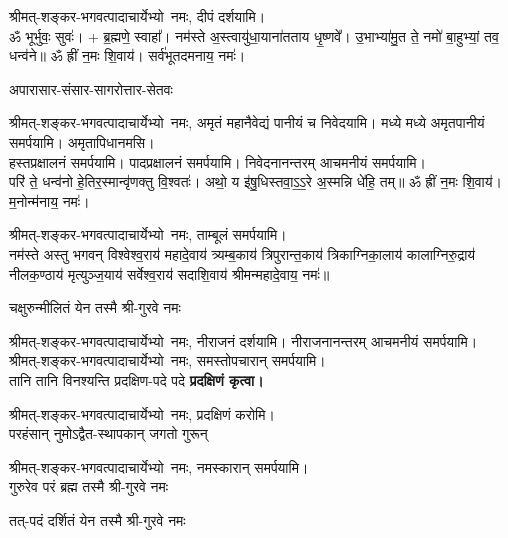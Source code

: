 \begin{center}
श्रीमत्-शङ्कर-भगवत्पादाचार्येभ्यो~नमः, दीपं दर्शयामि।\\


ॐ भूर्भुवः॒ सुवः॑। + ब्र॒ह्मणे॒ स्वाहा᳚। नम॑स्ते अ॒स्त्वायु॑धा॒याना॑तताय धृ॒ष्णवे᳚। उ॒भाभ्या॑मु॒त ते॒ नमो॑ बा॒हुभ्यां॒ तव॒ धन्व॑ने॥ ॐ ह्रीं न॒मः शि॒वाय॑। सर्व॑भूतदमनाय॒ नमः॑। 

{अपारासार-संसार-सागरोत्तार-सेतवः}

श्रीमत्-शङ्कर-भगवत्पादाचार्येभ्यो~नमः, अमृतं महानैवेद्यं पानीयं च निवेदयामि। मध्ये मध्ये अमृतपानीयं समर्पयामि। अमृतापिधानमसि।\\
हस्तप्रक्षालनं समर्पयामि। पादप्रक्षालनं समर्पयामि। निवेदनानन्तरम् आचमनीयं समर्पयामि।\\


परि॑ ते॒ धन्व॑नो हे॒तिर॒स्मान्वृ॑णक्तु वि॒श्वतः॑। अथो॒ य इ॑षु॒धिस्तवा॒ऽ॒ऽ॒रे अ॒स्मन्नि धे॑हि॒ तम्॥ ॐ ह्रीं न॒मः शि॒वाय॑। म॒नोन्म॑नाय॒ नमः॑। 


श्रीमत्-शङ्कर-भगवत्पादाचार्येभ्यो~नमः, ताम्बूलं समर्पयामि।\\

नम॑स्ते अस्तु भगवन् विश्वेश्व॒राय॑ महादे॒वाय॑ त्र्यम्ब॒काय॑ त्रिपुरान्त॒काय॑ त्रिकाग्निका॒लाय॑ कालाग्निरु॒द्राय॑ नीलक॒ण्ठाय॑ मृत्युञ्ज॒याय॑ सर्वेश्व॒राय॑ सदाशि॒वाय॑ श्रीमन्महादे॒वाय॒ नमः॑॥

{चक्षुरुन्मीलितं येन तस्मै श्री-गुरवे नमः}

श्रीमत्-शङ्कर-भगवत्पादाचार्येभ्यो~नमः, नीराजनं दर्शयामि। नीराजनानन्तरम् आचमनीयं समर्पयामि।\\

श्रीमत्-शङ्कर-भगवत्पादाचार्येभ्यो~नमः, समस्तोपचारान् समर्पयामि।\\


{तानि तानि विनश्यन्ति प्रदक्षिण-पदे पदे}
\textbf{प्रदक्षिणं कृत्वा।}
\medskip

श्रीमत्-शङ्कर-भगवत्पादाचार्येभ्यो~नमः, प्रदक्षिणं करोमि।\\

{परहंसान् नुमोऽद्वैत-स्थापकान् जगतो गुरून्}

श्रीमत्-शङ्कर-भगवत्पादाचार्येभ्यो~नमः, नमस्कारान् समर्पयामि।\\

{गुरुरेव परं ब्रह्म तस्मै श्री-गुरवे नमः}

{तत्-पदं दर्शितं येन तस्मै श्री-गुरवे नमः}


\end{center}
